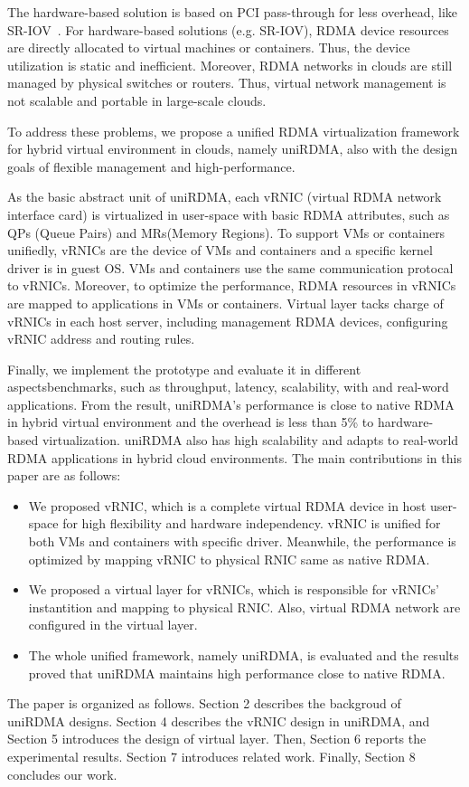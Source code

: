 The hardware-based solution is based on PCI pass-through for less overhead, like SR-IOV~\cite{sr-iov}. For hardware-based solutions (e.g. SR-IOV), RDMA device resources are directly allocated to virtual machines or containers. Thus, the device utilization is static and inefficient. Moreover, RDMA networks in clouds are still managed by physical switches or routers. Thus, virtual network management is not scalable and portable in large-scale clouds.

To address these problems, we propose a unified RDMA virtualization framework for hybrid virtual environment in clouds, namely uniRDMA, also with the design goals of flexible management and high-performance. 

As the basic abstract unit of uniRDMA, each vRNIC (virtual RDMA network interface card) is virtualized in user-space with basic RDMA attributes, such as QPs (Queue Pairs) and MRs(Memory Regions). To support VMs or containers unifiedly, vRNICs are the device of VMs and containers and a specific kernel driver is in guest OS. VMs and containers use the same communication protocal to vRNICs. Moreover, to optimize the performance, RDMA resources in vRNICs are mapped to applications in VMs or containers. Virtual layer tacks charge of vRNICs in each host server, including management RDMA devices, configuring vRNIC address and routing rules. 

Finally, we implement the prototype and evaluate it in different aspectsbenchmarks, such as throughput, latency, scalability, with and real-word applications. From the result, uniRDMA's performance is close to native RDMA in hybrid virtual environment and the overhead is less than 5\% to hardware-based virtualization. uniRDMA also has high scalability and adapts to real-world RDMA applications in hybrid cloud environments. The main contributions in this paper are as follows:

\begin{itemize}
\item We proposed vRNIC, which is a complete virtual RDMA device in host user-space for high flexibility and hardware independency. vRNIC is unified for both VMs and containers with specific driver. Meanwhile, the performance is optimized by mapping vRNIC to physical RNIC same as native RDMA.

\item We proposed a virtual layer for vRNICs, which is responsible for vRNICs' instantition and mapping to physical RNIC. Also, virtual RDMA network are configured in the virtual layer.

\item The whole unified framework, namely uniRDMA, is evaluated and the results proved that uniRDMA maintains high performance close to native RDMA.
\end{itemize}

The paper is organized as follows. Section 2 describes the backgroud of uniRDMA designs. Section 4 describes the vRNIC design in uniRDMA, and Section 5 introduces the design of virtual layer. Then, Section 6 reports the experimental results. Section 7 introduces related work. Finally, Section 8 concludes our work.
